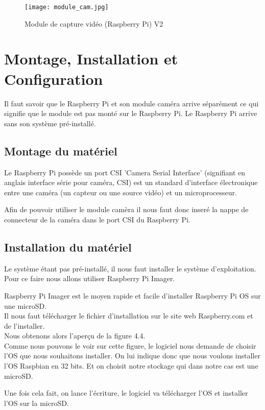         \begin{figure}[ht]
            \centering        
            \texttt{[image: module\_cam.jpg]}
            \caption{Module de capture vidéo (Raspberry Pi) V2}
        \end{figure}
        
    \section{Montage, Installation et Configuration}
    Il faut savoir que le Raspberry Pi et son module caméra arrive séparément ce qui signifie que le module est pas monté sur le Raspberry Pi.
    Le Raspberry Pi arrive sans son système pré-installé.
        \subsection{Montage du matériel}
        Le Raspberry Pi possède un port CSI 'Camera Serial Interface' (signifiant en anglais interface série pour caméra, CSI) est un standard d'interface électronique entre une caméra (un capteur ou une source vidéo) et un microprocesseur.

        \vspace{0.2cm}

        Afin de pouvoir utiliser le module camèra il nous faut donc inseré la nappe de connecteur de la caméra dans le port CSI du Raspberry Pi.
        \subsection{Installation du matériel}
        Le système étant pas pré-installé, il nous faut installer le système d'exploitation.
        Pour ce faire nous allons utiliser Raspberry Pi Imager.

        \vspace{0.2cm}

        \begin{flushleft}
            Raspberry Pi Imager est le moyen rapide et facile d'installer Raspberry Pi OS sur une microSD.\\[0.2cm]

            Il nous faut télécharger le fichier d'installation sur le site web Raspberry.com et de l'installer.\\[0.2cm]

            Nous obtenons alors l'aperçu de la figure 4.4.\\[0.2cm]
            Comme nous pouvons le voir sur cette figure, le logiciel nous demande de choisir l'OS que nous souhaitons installer.
            On lui indique donc que nous voulons installer l'OS Raspbian en 32 bits. Et on choisit notre stockage qui dans notre cas est une microSD.

            \vspace{0.2cm}

            Une fois cela fait, on lance l'écriture, le logiciel va télécharger l'OS et installer l'OS sur la microSD.
        \end{flushleft}


